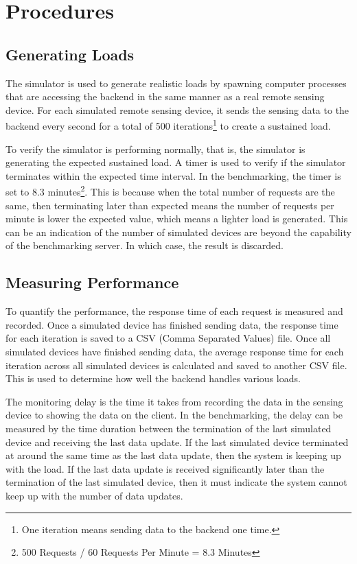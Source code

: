 \documentclass[../thesis.tex]{subfiles}
\begin{document}
\section{Procedures}

\subsection{Generating Loads}

The simulator is used to generate realistic loads by spawning computer processes that are accessing the backend in the same manner as a real remote sensing device. For each simulated remote sensing device, it sends the sensing data to the backend every second for a total of 500 iterations\footnote{One iteration means sending data to the backend one time.} to create a sustained load.

To verify the simulator is performing normally, that is, the simulator is generating the expected sustained load. A timer is used to verify if the simulator terminates within the expected time interval. In the benchmarking, the timer is set to 8.3 minutes\footnote{500 Requests / 60 Requests Per Minute = 8.3 Minutes}. This is because when the total number of requests are the same, then terminating later than expected means the number of requests per minute is lower the expected value, which means a lighter load is generated. This can be an indication of the number of simulated devices are beyond the capability of the benchmarking server. In which case, the result is discarded.


\subsection{Measuring Performance}

To quantify the performance, the response time of each request is measured and recorded. Once a simulated device has finished sending data, the response time for each iteration is saved to a CSV (Comma Separated Values) file. Once all simulated devices have finished sending data, the average response time for each iteration across all simulated devices is calculated and saved to another CSV file. This is used to determine how well the backend handles various loads.

The monitoring delay is the time it takes from recording the data in the sensing device to showing the data on the client. In the benchmarking, the delay can be measured by the time duration between the termination of the last simulated device and receiving the last data update. If the last simulated device terminated at around the same time as the last data update, then the system is keeping up with the load. If the last data update is received significantly later than the termination of the last simulated device, then it must indicate the system cannot keep up with the number of data updates.
\end{document}
